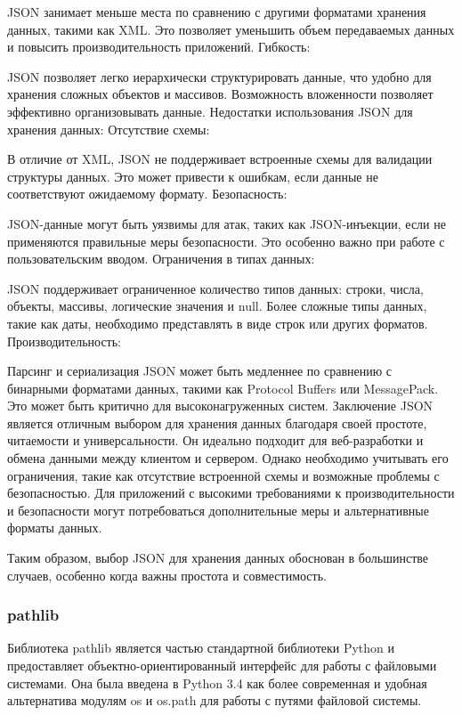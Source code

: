 JSON занимает меньше места по сравнению с другими форматами хранения данных, такими как XML. Это позволяет уменьшить объем передаваемых данных и повысить производительность приложений.
Гибкость:

JSON позволяет легко иерархически структурировать данные, что удобно для хранения сложных объектов и массивов.
Возможность вложенности позволяет эффективно организовывать данные.
Недостатки использования JSON для хранения данных:
Отсутствие схемы:

В отличие от XML, JSON не поддерживает встроенные схемы для валидации структуры данных. Это может привести к ошибкам, если данные не соответствуют ожидаемому формату.
Безопасность:

JSON-данные могут быть уязвимы для атак, таких как JSON-инъекции, если не применяются правильные меры безопасности. Это особенно важно при работе с пользовательским вводом.
Ограничения в типах данных:

JSON поддерживает ограниченное количество типов данных: строки, числа, объекты, массивы, логические значения и null. Более сложные типы данных, такие как даты, необходимо представлять в виде строк или других форматов.
Производительность:

Парсинг и сериализация JSON может быть медленнее по сравнению с бинарными форматами данных, такими как Protocol Buffers или MessagePack. Это может быть критично для высоконагруженных систем.
Заключение
JSON является отличным выбором для хранения данных благодаря своей простоте, читаемости и универсальности. Он идеально подходит для веб-разработки и обмена данными между клиентом и сервером. Однако необходимо учитывать его ограничения, такие как отсутствие встроенной схемы и возможные проблемы с безопасностью. Для приложений с высокими требованиями к производительности и безопасности могут потребоваться дополнительные меры и альтернативные форматы данных.

Таким образом, выбор JSON для хранения данных обоснован в большинстве случаев, особенно когда важны простота и совместимость.
\subsubsection{pathlib}

Библиотека pathlib является частью стандартной библиотеки Python и предоставляет объектно-ориентированный интерфейс для работы с файловыми системами. Она была введена в Python 3.4 как более современная и удобная альтернатива модулям os и os.path для работы с путями файловой системы.

